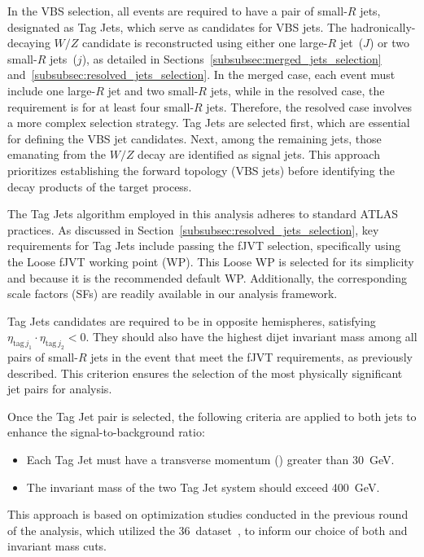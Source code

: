 \label{subsec:vbs_selection}

In the VBS selection, all events are required to have a pair of small-$R$ jets, designated as Tag Jets, which serve as candidates for VBS jets.
The hadronically-decaying $W/Z$ candidate is reconstructed using either one large-$R$ jet~($J$) or two small-$R$ jets~($j$), as detailed in Sections~\ref{subsubsec:merged_jets_selection} and~\ref{subsubsec:resolved_jets_selection}. 
In the merged case, each event must include one large-$R$ jet and two small-$R$ jets, while in the resolved case, the requirement is for at least four small-$R$ jets. 
Therefore, the resolved case involves a more complex selection strategy. Tag Jets are selected first, which are essential for defining the VBS jet candidates. Next, among the remaining jets, those emanating from the $W/Z$ decay are identified as signal jets. This approach prioritizes establishing the forward topology (VBS jets) before identifying the decay products of the target process.

The Tag Jets algorithm employed in this analysis adheres to standard ATLAS practices. As discussed in Section~\ref{subsubsec:resolved_jets_selection}, key requirements for Tag Jets include passing the fJVT selection, specifically using the Loose fJVT working point (WP). This Loose WP is selected for its simplicity and because it is the recommended default WP. Additionally, the corresponding scale factors (SFs) are readily available in our analysis framework.

Tag Jets candidates are required to be in opposite hemispheres, satisfying $\eta_{\mathrm{tag}\, j_1} \cdot \eta_{\mathrm{tag}\, j_2} < 0$. They should also have the highest dijet invariant mass among all pairs of small-$R$ jets in the event that meet the fJVT requirements, as previously described. This criterion ensures the selection of the most physically significant jet pairs for analysis.

Once the Tag Jet pair is selected, the following criteria are applied to both jets to enhance the signal-to-background ratio:
\begin{itemize}
    \item Each Tag Jet must have a transverse momentum (\pt) greater than \SI{30}{\GeV}.
    \item The invariant mass of the two Tag Jet system should exceed \SI{400}{\GeV}.
\end{itemize}

This approach is based on optimization studies conducted in the previous round of the analysis, which utilized the 36 \,\ifb dataset~\cite{Ryzhov:2310214}, to inform our choice of both \pT and invariant mass cuts.

